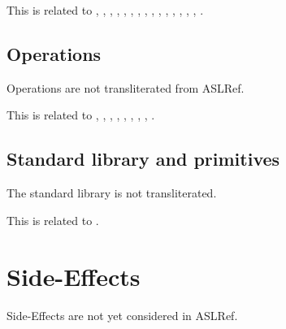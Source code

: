 \documentclass{book}
\begin{document}
This is related to , , , ,
, , , , ,
, , , , ,
, .

\subsection{Operations}

Operations are not transliterated from ASLRef.

This is related to , , , ,
, , , , .

\subsection{Standard library and primitives}

The standard library is not transliterated.

This is related to .

\section{Side-Effects}

Side-Effects are not yet considered in ASLRef.
\end{document}
